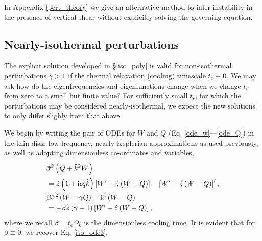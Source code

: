 In Appendix \ref{pert_theory} we give an alternative method to
infer instability in the presence of vertical shear without explicitly
solving the governing equation. 

\subsection{Nearly-isothermal perturbations}
The explicit solution developed in \S\ref{iso_poly} is valid for
non-isothermal perturbations $\gamma>1$ if the thermal relaxation
(cooling) timescale $t_c\equiv0$. We may ask how
do the eigenfrequencies and eigenfunctions change when we change
$t_c$ from zero to a small but finite value? For sufficiently small
$t_c$, for which the perturbations may be considered
nearly-isothermal, we expect the new solutions to only differ slighly
from that above. 


We begin by writing the pair of ODEs for $W$ and $Q$
(Eq. \ref{ode_w}---\ref{ode_Q}) in the thin-disk, low-frequency, 
nearly-Keplerian approximations as used previously, as well as
adopting dimensionless co-ordinates and variables, 
\begin{align}
  &\hat{\sigma}^2\left(Q +  \hat{k}^2W\right) \notag\\ 
  &= \hat{z} \left(1 +
    \mathrm{i}\epsilon q \hat{k} \right)\left[W^\prime - \hat{z} \left(W -
      Q\right)\right] - \left[W^\prime - \hat{z} \left(W -
      Q\right)\right]^\prime\label{nearly_iso1},\\
&\beta \hat{\sigma}^2\left(W - \gamma Q\right) + \mathrm{i}\hat{\sigma}
    \left(W-Q\right)\notag\\
   & = -\beta\hat{z}\left(\gamma-1\right) \left[W^\prime - \hat{z} \left(W -
      Q\right)\right]\label{nearly_iso2},
\end{align}
where we recall $\beta = t_c\Omega_k$ is the dimensionless cooling
time. It is evident that for $\beta\equiv 0$, we recover
Eq. \ref{iso_ode3}. 

